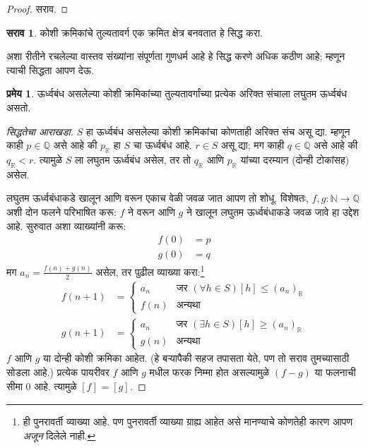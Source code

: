 \documentclass[11pt,a4paper,openany]{book}
\theoremstyle{definition}
\newtheorem{thm}[defn]{प्रमेय}
\newtheorem{prob}{सराव}[chapter]
\newcommand{\Nat}{\mathbb{N}}
\newcommand{\Rat}{\mathbb{Q}}
\newcommand{\Real}{\mathbb{R}}
\newcommand{\equivrep}[2]{[#1]_{#2}}
\begin{document}
\begin{proof}
सराव.
\end{proof}

\begin{prob}
कोशी क्रमिकांचे तुल्यतावर्ग एक क्रमित क्षेत्र बनवतात हे सिद्ध करा.
\end{prob}

अशा रीतीने रचलेल्या वास्तव संख्यांना संपूर्णता गुणधर्म आहे हे सिद्ध
करणे अधिक कठीण आहे; म्हणून त्याची सिद्धता आपण देऊ.

\begin{thm}
ऊर्ध्वबंध असलेल्या कोशी क्रमिकांच्या तुल्यतावर्गांच्या प्रत्येक अरिक्त
संचाला लघुतम ऊर्ध्वबंध असतो.
\end{thm}

\begin{proof}[सिद्धतेचा आराखडा]
$S$ हा ऊर्ध्वबंध असलेल्या कोशी क्रमिकांचा कोणताही अरिक्त संच असू द्या.
म्हणून काही $p \in \Rat$ असे आहे की $p_{\Real}$ हा $S$ चा ऊर्ध्वबंध
आहे. $r \in S$ असू द्या; मग काही $q \in \Rat$ असे आहे की
$q_{\Real} < r$. त्यामुळे $S$ ला लघुतम ऊर्ध्वबंध असेल, तर तो
$q_\Real$ आणि $p_\Real$ यांच्या दरम्यान (दोन्ही टोकांसह) असेल.

लघुतम ऊर्ध्वबंधाकडे खालून आणि वरून एकाच वेळी जवळ जात आपण तो शोधू.
विशेषतः, $f, g \colon \Nat \to \Rat$ अशी दोन फलने परिभाषित करू:
$f$ ने वरून आणि $g$ ने खालून लघुतम ऊर्ध्वबंधाकडे जवळ जावे हा उद्देश
आहे. सुरुवात अशा व्याख्यांनी करू:
\begin{align*}
	f(0) &= p \\
	g(0) &= q
\end{align*}
मग $a_n = \frac{f(n) + g(n)}{2}$ असेल, तर पुढील व्याख्या
करा:\footnote{ही पुनरावर्ती व्याख्या आहे. पण पुनरावर्ती व्याख्या ग्राह्य
आहेत असे मानण्याचे कोणतेही कारण आपण \emph{अजून} दिलेले नाही.}
\begin{align*}
	f(n+1) &=
	\begin{cases}
		a_n &\text{जर }(\forall h \in S)\equivrep{h}{} \leq (a_n)_\Real\\
		f(n)&\text{अन्यथा}
	\end{cases}\\
	g(n+1) &=
	\begin{cases}
		a_n &\text{जर }(\exists h \in S)\equivrep{h}{} \geq (a_n)_\Real\\
	 	g(n) &\text{अन्यथा}
	\end{cases}
\end{align*}
$f$ आणि $g$ या दोन्ही कोशी क्रमिका आहेत. (हे बऱ्यापैकी सहज तपासता
येते, पण तो सराव तुमच्यासाठी सोडला आहे.) प्रत्येक पायरीवर $f$ आणि
$g$ मधील फरक निम्मा होत असल्यामुळे $(f-g)$ या फलनाची सीमा $0$ आहे.
त्यामुळे $\equivrep{f}{} = \equivrep{g}{}$.


\end{proof}
\end{document}
